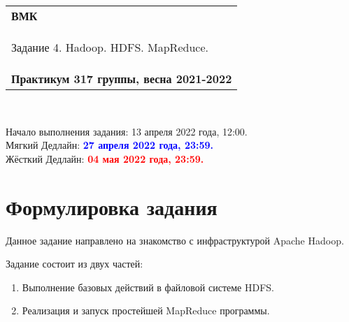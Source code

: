 \documentclass[10pt,fleqn]{article}
\begin{document}
\begin{center}
    \begin{tabular}{|p{17.5cm}|}
        \hline
        \textbf{ВМК}\\
        \begin{center} \Large Задание 4. Hadoop. HDFS. MapReduce. \end{center}\\
        \textbf{Практикум 317 группы, весна 2021-2022}\\
        \hline
    \end{tabular}
\end{center}

\

\begin{tabbing}
    Начало выполнения задания: 13 апреля 2022 года, 12:00.\\
    Мягкий Дедлайн: \textcolor{blue}{\bf 27 апреля 2022 года, 23:59.} \\
    Жёсткий Дедлайн: \textcolor{red}{\bf 04 мая 2022 года, 23:59.}
\end{tabbing}


\section*{Формулировка задания}
Данное задание направлено на знакомство с инфраструктурой Apache Hadoop.


Задание состоит из двух частей:
\begin{enumerate}
 \item Выполнение базовых действий в файловой системе HDFS.
 \item Реализация и запуск простейшей MapReduce программы.
\end{enumerate}
\end{document}
